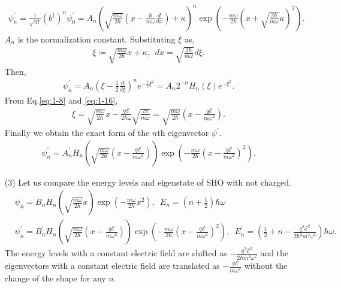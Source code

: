 \documentclass[floatfix,nofootinbib,superscriptaddress,fleqn]{revtex4-2}
\begin{document}
\begin{itemize}
\begin{align}
      \psi_n^\prime = \frac{1}{\sqrt{n!}}(b^\dagger)^n
      \psi_0^\prime
      =A_n
      \left(
        \sqrt{\frac{m\omega}{2\hbar}}
        \left(x-\frac{\hbar}{m\omega}\frac{d}{dx}\right)
      +\kappa\right)^n
      \exp{\left(-\frac{m\omega}{2\hbar}
      {\left(x +\sqrt{\frac{2\hbar}{m\omega}}\kappa\right)}
        ^2\right)}.
    \end{align}
    $A_n$ is the normalization constant. Substituting $\xi$ as,
    \begin{align}\label{eq:1-16}
      \xi \coloneqq \sqrt{\frac{m\omega}{2\hbar}}x+\kappa,\,\,\,
      dx = \sqrt{\frac{2\hbar}{m\omega}}d\xi.
    \end{align}
    Then,
    \begin{align}
      \psi_n^\prime=A_n
      \left(
      \xi-\frac{1}{2}\frac{d}{d\xi}
      \right)^ne^{-\frac{1}{2}\xi^2}
      =A_n2^{-n}
      H_n(\xi)e^{-\xi^2}.
    \end{align}
    From Eq.\eqref{eq:1-8} and \eqref{eq:1-16},
    \begin{align}
      \xi = \sqrt{\frac{m\omega}{2\hbar}}x
      -\frac{q\mathcal{E}}{2\hbar\omega}
       \sqrt{\frac{2\hbar}{m\omega}}
      =\sqrt{\frac{m\omega}{2\hbar}}\left(x
      -\frac{q\mathcal{E}}{m\omega^2}\right).
    \end{align}
    Finally we obtain the exact form of the $n$th eigenvector $\psi^\prime$.
    \begin{align}\label{eq:1-15}
      \psi_n^\prime=A_n^\prime
      H_n\left(\sqrt{\frac{m\omega}{2\hbar}}\left(x
      -\frac{q\mathcal{E}}{m\omega^2}\right)\right)
      \exp{\left(-\frac{m\omega}{2\hbar}\left(x
      -\frac{q\mathcal{E}}{m\omega^2}\right)^2\right)}.
    \end{align}

  \item[(3)] Let us compare the energy levels 
  and eigenstate of SHO with not charged.
  \begin{align}
    &\psi_n = B_nH_n\left(\sqrt{\frac{m\omega}{2\hbar}}x\right)
    \exp{\left(-\frac{m\omega}{2\hbar}x^2\right)},\,\,\,
    E_n=\left(n+\frac{1}{2}\right)\hbar\omega \\
    &\psi_n^\prime=B^\prime_nH_n\left(\sqrt{\frac{m\omega}{2\hbar}}
    \left(x-\frac{q\mathcal{E}}{m\omega^2}\right)\right)
    \exp{\left(-\frac{m\omega}{2\hbar}\left(x
    -\frac{q\mathcal{E}}{m\omega^2}\right)^2\right)},\,\,\,
    E^\prime_n= \left(\frac{1}{2}+n
    -\frac{q^2\mathcal{E}^2}{2\hbar^2 m^2\omega^3}\right)\hbar\omega.
  \end{align}
  The energy levels with a constant electric field are shifted as 
  $-\frac{q^2\mathcal{E}^2}{2\hbar m^2\omega^2}$ and the eigenvectors
  with a constant electric field are translated as 
  $-\frac{q\mathcal{E}}{m\omega^2}$ without the change of the shape 
  for any $n$.
  \end{itemize}
\end{document}
